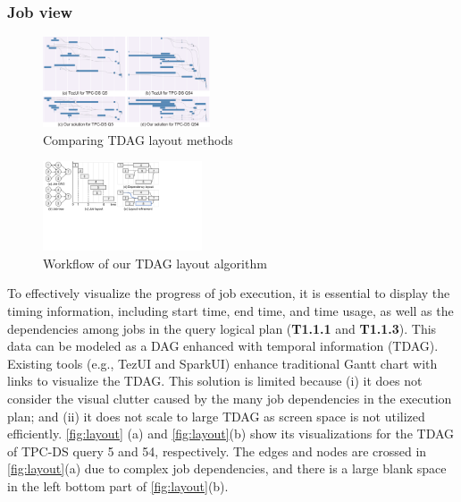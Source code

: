 \subsubsection{Job view}\label{sec:job}

\begin{figure}
	\centering
	\small
	\includegraphics[width=0.44\textwidth]{figures/visualization/exeprogressSDS.pdf}
	\vspace{-3mm}
	\caption{Comparing TDAG layout methods}
	\label{fig:layout}
	\vspace{-3mm}
\end{figure}

\begin{figure}
	\centering
	\small	
	\includegraphics[width=0.42\textwidth]{figures/visualization/TDAG-new-algo.pdf}
	\vspace{-3mm}
	\caption{Workflow of our TDAG layout algorithm}
	\label{fig:layoutmethod}
	\vspace{-5mm}
\end{figure}




To effectively visualize the progress of job execution, it is essential to display the timing information, including start time, end time, and time usage, as well as the dependencies among jobs in the query logical plan (\textbf{T1.1.1} and \textbf{T1.1.3}). This data can be modeled as a DAG enhanced with temporal information (TDAG).
Existing tools (e.g., TezUI and SparkUI) enhance traditional Gantt chart with links to visualize the TDAG. 
This solution is limited because (i) it does not consider the visual clutter caused by the many job dependencies in the execution plan; and (ii) it does not scale to large TDAG as screen space is not utilized efficiently. \autoref{fig:layout} (a) and \autoref{fig:layout}(b) show its visualizations for the TDAG of TPC-DS query 5 and 54, respectively. The edges and nodes are crossed in \autoref{fig:layout}(a) due to complex job dependencies, and there is a large blank space in the left bottom part of \autoref{fig:layout}(b).


